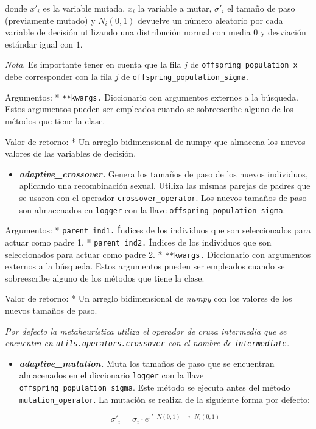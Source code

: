 \documentclass[11pt]{article}
\providecommand{\tightlist}{%
      \setlength{\itemsep}{0pt}\setlength{\parskip}{0pt}}
\begin{document}
donde \(x'_i\) es la variable mutada, \(x_i\) la variable a mutar,
\(\sigma'_i\) el tamaño de paso (previamente mutado) y \(N_{i}(0,1)\)
devuelve un número aleatorio por cada variable de decisión utilizando
una distribución normal con media \(0\) y desviación estándar igual con
\(1\).

\emph{Nota}. Es importante tener en cuenta que la fila \(j\) de
\texttt{offspring\_population\_x} debe corresponder con la fila \(j\) de
\texttt{offspring\_population\_sigma}.

Argumentos: * \texttt{**kwargs.} Diccionario con argumentos externos a
la búsqueda. Estos argumentos pueden ser empleados cuando se
sobreescribe alguno de los métodos que tiene la clase.

Valor de retorno: * Un arreglo bidimensional de numpy que almacena los
nuevos valores de las variables de decisión.

    \begin{itemize}
\tightlist
\item
  \emph{\textbf{adaptive\_crossover.}} Genera los tamaños de paso de los
  nuevos individuos, aplicando una recombinación sexual. Utiliza las
  mismas parejas de padres que se usaron con el operador
  \texttt{crossover\_operator}. Los nuevos tamaños de paso son
  almacenados en \texttt{logger} con la llave
  \texttt{offspring\_population\_sigma}.
\end{itemize}

Argumentos: * \texttt{parent\_ind1.} Índices de los individuos que son
seleccionados para actuar como padre 1. * \texttt{parent\_ind2.} Índices
de los individuos que son seleccionados para actuar como padre 2. *
\texttt{**kwargs.} Diccionario con argumentos externos a la búsqueda.
Estos argumentos pueden ser empleados cuando se sobreescribe alguno de
los métodos que tiene la clase.

Valor de retorno: * Un arreglo bidimensional de \emph{numpy} con los
valores de los nuevos tamaños de paso.

\emph{Por defecto la metaheurística utiliza el operador de cruza
intermedia que se encuentra en \texttt{utils.operators.crossover} con el
nombre de \texttt{intermediate}.}

    \begin{itemize}
\item
  \emph{\textbf{adaptive\_mutation.}} Muta los tamaños de paso que se
  encuentran almacenados en el diccionario \texttt{logger} con la llave
  \texttt{offspring\_population\_sigma}. Este método se ejecuta antes
  del método \texttt{mutation\_operator}. La mutación se realiza de la
  siguiente forma por defecto:

  \begin{equation*}
    \label{eq:mutarNSigmas}
    \sigma'_i = \sigma_i \cdot e ^ {\tau' \cdot N(0,1) + \tau \cdot N_i(0,1)}
  \end{equation*}
\end{itemize}
\end{document}
